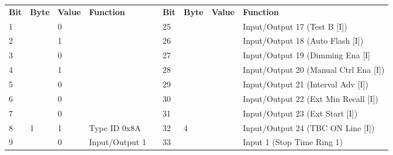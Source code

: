 \documentclass[]{article}
\begin{document}
\begin{landscape}
	\begin{table}[]
		\begin{tabular}{lllllllll}
			\cline{1-4} \cline{6-9}
			\textbf{Bit} & \textbf{Byte}       & \textbf{Value} & \textbf{Function}                       &                    & \textbf{Bit} & \textbf{Byte}       & \textbf{Value} & \textbf{Function}                         \\ \cline{1-4} \cline{6-9} 
			1            &                     & 0              &                                         &                    & 25           &                     &                & Input/Output 17 (Test B {[}I{]})          \\
			2            &                     & 1              &                                         &                    & 26           &                     &                & Input/Output 18 (Auto Flash {[}I{]})      \\
			3            &                     & 0              &                                         &                    & 27           &                     &                & Input/Output 19 (Dimming Ena {[}I{]}      \\
			4            &                     & 1              &                                         &                    & 28           &                     &                & Input/Output 20 (Manual Ctrl Ena {[}I{]}) \\
			5            &                     & 0              &                                         &                    & 29           &                     &                & Input/Output 21 (Interval Adv {[}I{]})    \\
			6            &                     & 0              &                                         &                    & 30           &                     &                & Input/Output 22 (Ext Min Recall {[}I{]})  \\
			7            &                     & 0              &                                         &                    & 31           &                     &                & Input/Output 23 (Ext Start {[}I{]})       \\
			8            & \multirow{-8}{*}{1} & 1              & \multirow{-8}{*}{Type ID 0x8A}          & \multirow{-9}{*}{} & 32           & \multirow{-8}{*}{4} &                & Input/Output 24 (TBC ON Line {[}I{]})     \\ \cline{1-4} \cline{6-9} 
			9            &                     & 0              & \cellcolor[HTML]{EFEFEF}Input/Output 1  &                    & 33           &                     &                & Input 1 (Stop Time Ring 1)                \\

\end{tabular}
\end{table}
\end{landscape}
\end{document}
